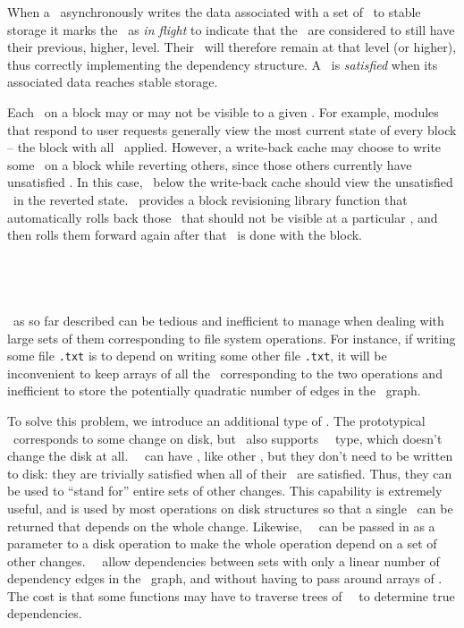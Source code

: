 When a \module\ asynchronously writes the data associated with a set of
\chdescs\ to stable storage it marks the \chdescs\ as \emph{in flight} to
indicate that the \chdescs\ are considered to still have their previous,
higher, level. Their \afters\ will therefore remain at that level (or higher),
thus correctly implementing the dependency structure. A \chdesc\ is
\emph{satisfied} when its associated data reaches stable storage.

Each \chdesc\ on a block may or may not be visible to a given \module. For
example, modules that respond to user requests generally view the most current
state of every block -- the block with all \chdescs\ applied. However, a
write-back cache may choose to write some \chdescs\ on a block while reverting
others, since those others currently have unsatisfied \befores. In this case,
\modules\ below the write-back cache should view the unsatisfied \chdescs\ in
the reverted state.
%
\Kudos\ provides a block revisioning library function that automatically rolls
back those \chdescs\ that should not be visible at a particular \module, and
then rolls them forward again after that \module\ is done with the block.

\subsection{\Noop\ \ChDescs}
\label{sec:chdescs:noop}
\Chdescs\ as so far described can be tedious and inefficient to manage when
dealing with large sets of them corresponding to file system operations. For
instance, if writing some file \texttt{\after.txt} is to depend on writing some
other file \texttt{\before.txt}, it will be inconvenient to keep arrays of all
the \chdescs\ corresponding to the two operations and inefficient to store the
potentially quadratic number of edges in the \chdesc\ graph.

To solve this problem, we introduce an additional type of \chdesc. The
prototypical \chdesc\ corresponds to some change on disk, but \Kudos\ also
supports \aemphnoop\ \chdesc\ type, which doesn't change the disk at all.
\Noop\ \chdescs\ can have \befores, like other \chdescs, but they don't need to
be written to disk: they are trivially satisfied when all of their \befores\ are
satisfied. Thus, they can be used to ``stand for'' entire sets of other changes.
%
This capability is extremely useful, and is used by most operations on disk
structures so that a single \chdesc\ can be returned that depends on the whole
change. Likewise, \anoop\ \chdesc\ can be passed in as a parameter to a disk
operation to make the whole operation depend on a set of other changes. \Noop\
\chdescs\ allow dependencies between sets with only a linear number of
dependency edges in the \chdesc\ graph, and without having to pass around arrays
of \chdescs.
%
The cost is that some functions may have to traverse trees of \noop\ \chdescs\
to determine true dependencies.
%


